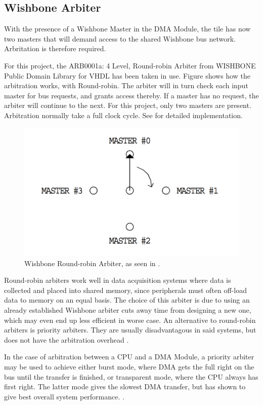 \subsection{Wishbone Arbiter}
With the presence of a Wishbone Master in the DMA Module, the tile has now two masters that will demand access to the shared Wishbone bus network. 
Arbritation is therefore required.

For this project, the ARB0001a: 4 Level, Round-robin Arbiter from WISHBONE Public Domain Library for VHDL has been taken in use.
Figure \cite{fig:WBArbiter} shows how the arbitration works, with Round-robin.
The arbiter will in turn check each input master for bus requests, and grants access thereby.
If a master has no request, the arbiter will continue to the next.
For this project, only two masters are present.
Arbitration normally take a full clock cycle.
See \cite{WBLibrary} for detailed implementation.

\begin{figure}[htb]
    \centering
    \includegraphics[width=1.0\textwidth]{Figures/Tile/WBArbiter}
    \caption{Wishbone Round-robin Arbiter, as seen in \cite{WBLibrary}.}
    \label{fig:WBArbiter}
\end{figure}

Round-robin arbiters work well in data acquisition systems where data is collected and placed into shared memory, since peripherals must often off-load data to memory on an equal basis.
The choice of this arbiter is due to using an already established Wishbone arbiter cuts away time from designing a new one, which may even end up less efficient in worse case.
An alternative to round-robin arbiters is priority arbiters.
They are usually disadvantagous in said systems, but does not have the arbitration overhead \cite{WBLibrary}.

In the case of arbitration between a CPU and a DMA Module, a priority arbiter may be used to achieve either burst mode, where DMA gets the full right on the bus until the transfer is finished, or transparent mode, where the CPU always has first right.
The latter mode gives the slowest DMA transfer, but has shown to give best overall system performance.  \cite{DMA-lecture}.

